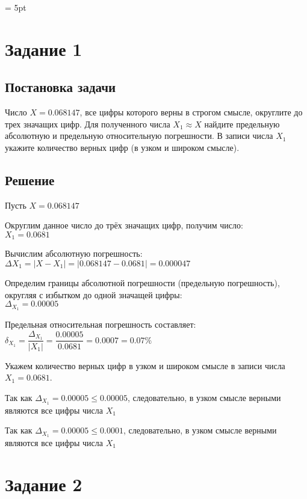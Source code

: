 \documentclass[a4paper, 14pt, fleqn]{extarticle}
\begin{document}
	\pagebreak	
	\parskip = 5pt

	\section{Задание 1}
		\subsection{Постановка задачи}
			\noindent Число \( X = 0.068147 \), все цифры которого верны в строгом смысле,
					округлите до трех значащих цифр. Для полученного числа \( X_1 \approx X \) найдите
					предельную абсолютную и предельную относительную погрешности. В
					записи числа \( X_1 \) укажите количество верных цифр (в узком и широком
					смысле).
	
		\subsection{Решение}

			\indent Пусть \( X = 0.068147 \)
			
			Округлим данное число до трёх значащих цифр, получим число: \\ \indent \( X_1 = 0.0681 \)

			Вычислим абсолютную погрешность:\\ \indent \( \Delta X_1 = |X-X_1| = |0.068147 - 0.0681| = 0.000047 \) 

			Определим границы абсолютной погрешности (предельную погрешность), округляя с избытком до одной значащей цифры: \\ \indent \( \Delta_{X_1}  = 0.00005\) 

			Предельная относительная погрешность составляет:  \\ \indent \( \delta_{X_1} = \dfrac{\Delta_{X_1}}{|X_1|} = \dfrac{0.00005}{0.0681} = 0.0007 = 0.07\% \)

			Укажем количество верных цифр в узком и широком смысле в записи числа \( X_1 = 0.0681 \).

			Так как \( \Delta_{X_1} = 0.00005 \leq 0.00005 \), следовательно, в узком смысле верными являются все цифры числа \(X_1\)

			Так как \( \Delta_{X_1} = 0.00005 \leq 0.0001 \), следовательно, в узком смысле верными являются все цифры числа \(X_1\)

	\pagebreak

	\section{Задание 2}
\end{document}
